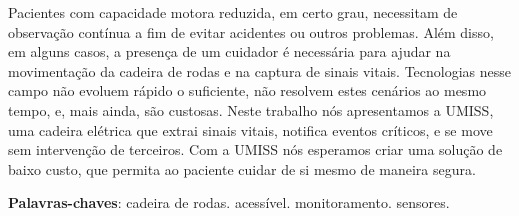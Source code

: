 \begin{resumo}

Pacientes com capacidade motora reduzida, em certo grau, necessitam de
observação contínua a fim de evitar acidentes ou outros problemas. Além
disso, em alguns casos, a presença de um cuidador é necessária para ajudar na
movimentação da cadeira de rodas e na captura de sinais vitais.
Tecnologias nesse campo não evoluem rápido o suficiente, não resolvem estes
cenários ao mesmo tempo, e, mais ainda, são custosas.
Neste trabalho nós apresentamos a UMISS, uma cadeira elétrica que extrai sinais
vitais, notifica eventos críticos, e se move sem intervenção de terceiros.
Com a UMISS nós esperamos criar uma solução de baixo custo, que permita ao
paciente cuidar de si mesmo de maneira segura.

 \vspace{\onelineskip}
    
 \noindent
 \textbf{Palavras-chaves}: cadeira de rodas. acessível. monitoramento. sensores.
\end{resumo}
